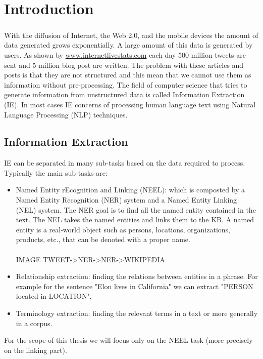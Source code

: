 \chapter{Introduction}
\paragraph{}
With the diffusion of Internet, the Web 2.0, and the mobile devices the amount of data generated grows exponentially. A large amount of this data is generated by users. As shown by \href{http://www.internetlivestats.com/}{www.internetlivestats.com} each day 500 million tweets are sent and 5 million blog post are written. The problem with these articles and posts is that they are not structured and this mean that we cannot use them as information without pre-processing. The field of computer science that tries to generate information from unstructured data is called Information Extraction (IE). In most cases IE concerns of processing human language text using Natural Language Processing (NLP) techniques.
\section{Information Extraction}
IE can be separated in many sub-tasks based on the data required to process. Typically the main sub-tasks are:
\begin{itemize}[itemsep = 0.1em]
\item Named Entity rEcognition and Linking (NEEL): which is composted by a Named Entity Recognition (NER) system and a Named Entity Linking (NEL) system. The NER goal is to find all the named entity contained in the text. The NEL takes the named entities and links them to the KB. A named entity is a real-world object such as persons, locations, organizations, products, etc., that can be denoted with a proper name.\\
\\
IMAGE TWEET->NER->NER->WIKIPEDIA
\item Relationship extraction: finding the relations between entities in a phrase. For example for the sentence "Elon lives in California" we can extract "PERSON located in LOCATION".

\item Terminology extraction: finding the relevant terms in a text or more generally in a corpus.
\end{itemize}

For the scope of this thesis we will focus only on the NEEL task (more precisely on the linking part).
